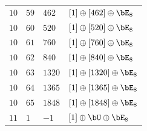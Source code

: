 \begin{center}
\begin{longtable}{llll}
 \(10\) & \(59\) & \(462\) & \([1] \oplus [462] \oplus \bE_{8}\) \\
 \(10\) & \(60\) & \(520\) & \([1] \oplus [520] \oplus \bE_{8}\) \\
 \(10\) & \(61\) & \(760\) & \([1] \oplus [760] \oplus \bE_{8}\) \\
 \(10\) & \(62\) & \(840\) & \([1] \oplus [840] \oplus \bE_{8}\) \\
 \(10\) & \(63\) & \(1320\) & \([1] \oplus [1320] \oplus \bE_{8}\) \\
 \(10\) & \(64\) & \(1365\) & \([1] \oplus [1365] \oplus \bE_{8}\) \\
 \(10\) & \(65\) & \(1848\) & \([1] \oplus [1848] \oplus \bE_{8}\) \\
\midrule
 \(11\) & \(1\) & \(-1\) & \([1] \oplus \bU \oplus \bE_{8}\) \\


\end{longtable}

\end{center}
